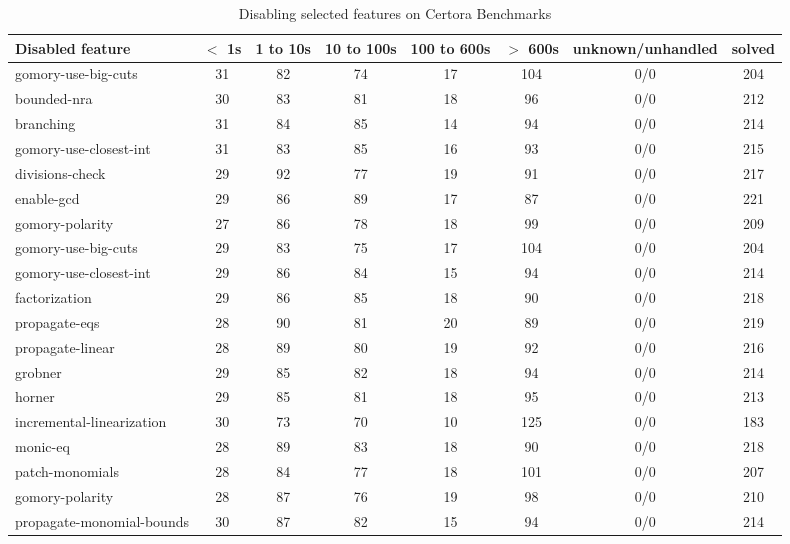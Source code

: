 \begin{table}
  \begin{tabular}{|l|c|c|c|c|c|c|c|}
    \hline
    Disabled feature & $<$ 1s & 1 to 10s & 10 to 100s & 100 to 600s & $>$ 600s & unknown/unhandled & solved \\
    \hline
    gomory-use-big-cuts & 31 & 82 & 74 & 17 & 104 & 0/0 & 204 \\
    \hline
    bounded-nra & 30 & 83 & 81 & 18 & 96 & 0/0 & 212 \\
    \hline
    branching & 31 & 84 & 85 & 14 & 94 & 0/0 & 214 \\
    \hline
    gomory-use-closest-int & 31 & 83 & 85 & 16 & 93 & 0/0 & 215 \\
    \hline
    divisions-check & 29 & 92 & 77 & 19 & 91 & 0/0 & 217 \\
    \hline
    enable-gcd & 29 & 86 & 89 & 17 & 87 & 0/0 & 221 \\
    \hline
    gomory-polarity & 27 & 86 & 78 & 18 & 99 & 0/0 & 209 \\
    \hline
    gomory-use-big-cuts & 29 & 83 & 75 & 17 & 104 & 0/0 & 204 \\
    \hline
    gomory-use-closest-int & 29 & 86 & 84 & 15 & 94 & 0/0 & 214 \\
    \hline
    factorization & 29 & 86 & 85 & 18 & 90 & 0/0 & 218 \\
    \hline
    propagate-eqs & 28 & 90 & 81 & 20 & 89 & 0/0 & 219 \\
    \hline
    propagate-linear & 28 & 89 & 80 & 19 & 92 & 0/0 & 216 \\
    \hline
    grobner & 29 & 85 & 82 & 18 & 94 & 0/0 & 214 \\
    \hline
    horner & 29 & 85 & 81 & 18 & 95 & 0/0 & 213 \\
    \hline
    incremental-linearization & 30 & 73 & 70 & 10 & 125 & 0/0 & 183 \\
    \hline
    monic-eq & 28 & 89 & 83 & 18 & 90 & 0/0 & 218 \\
    \hline
    patch-monomials & 28 & 84 & 77 & 18 & 101 & 0/0 & 207 \\
    \hline
    gomory-polarity & 28 & 87 & 76 & 19 & 98 & 0/0 & 210 \\
    \hline
    propagate-monomial-bounds & 30 & 87 & 82 & 15 & 94 & 0/0 & 214 \\
    \hline
    \end{tabular}
  \caption{Disabling selected features on Certora Benchmarks \label{tab:benchmark-submission}}
\end{table}


